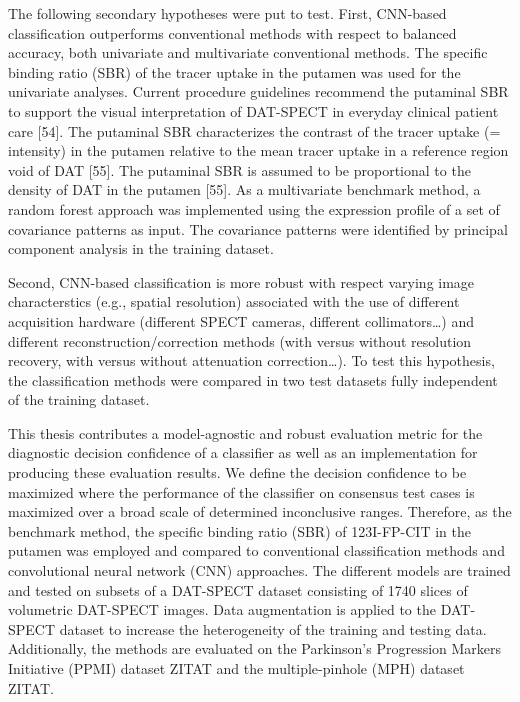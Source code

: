The following secondary hypotheses were put to test. First, CNN-based classification outperforms conventional methods with respect to balanced accuracy, 
both univariate and multivariate conventional methods. 
The specific binding ratio (SBR) of the tracer uptake in the putamen was used for the univariate analyses. 
Current procedure guidelines recommend the putaminal SBR to support the visual interpretation of DAT-SPECT in everyday clinical patient care [54]. 
The putaminal SBR characterizes the contrast of the tracer uptake (= intensity) in the putamen relative to the mean tracer uptake in a reference 
region void of DAT [55]. 
The putaminal SBR is assumed to be proportional to the density of DAT in the putamen [55]. 
As a multivariate benchmark method, a random forest approach was implemented using the expression profile of a set of covariance patterns as input. 
The covariance patterns were identified by principal component analysis in the training dataset. 

Second, CNN-based classification is more robust with respect varying image characterstics (e.g., spatial resolution) 
associated with the use of different acquisition hardware (different SPECT cameras, different collimators…) and different reconstruction/correction methods 
(with versus without resolution recovery, with versus without attenuation correction…). 
To test this hypothesis, the classification methods were compared in two test datasets fully independent of the training dataset.









This thesis contributes a model-agnostic and robust evaluation metric for the diagnostic decision confidence of a classifier 
as well as an implementation for producing these evaluation results.
We define the decision confidence to be maximized where the performance of the classifier on consensus test cases 
is maximized over a broad scale of determined inconclusive ranges.
Therefore, as the benchmark method, the specific binding ratio (SBR) of 123I-FP-CIT in the putamen was employed and 
compared to conventional classification methods and convolutional neural network (CNN) approaches.
The different models are trained and tested on subsets of a DAT-SPECT dataset consisting of 1740 slices of 
volumetric DAT-SPECT images.
Data augmentation is applied to the DAT-SPECT dataset to increase the heterogeneity of the training and testing data.
Additionally, the methods are evaluated on the Parkinson's Progression Markers Initiative (PPMI) dataset ZITAT and 
the multiple-pinhole (MPH) dataset ZITAT.

